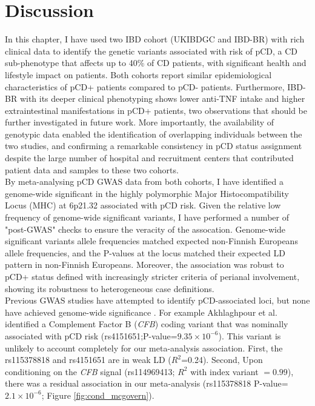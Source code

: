   
\section{Discussion}
In this chapter, I have used two IBD cohort (UKIBDGC and IBD-BR) with rich clinical data to identify the genetic variants associated with risk of pCD, a CD sub-phenotype that affects up to 40\% of CD patients, with significant health and lifestyle impact on patients. Both cohorts report similar epidemiological characteristics of pCD+ patients compared to pCD- patients. Furthermore, IBD-BR with its deeper clinical phenotyping shows lower anti-TNF intake and higher extraintestinal manifestations in pCD+ patients, two observations that should be further investigated in future work. More importantly, the availability of genotypic data enabled the identification of overlapping individuals between the two studies, and confirming a remarkable consistency in pCD status assignment despite the large number of hospital and recruitment centers that contributed patient data and samples to these two cohorts.\\

By meta-analysing pCD GWAS data from both cohorts, I have identified a genome-wide significant in the highly polymorphic Major Histocompatibility Locus (MHC) at 6p21.32 associated with pCD risk. Given the relative low frequency of genome-wide significant variants, I have performed a number of "post-GWAS" checks to ensure the veracity of the assocation. Genome-wide significant variants allele frequencies matched expected non-Finnish Europeans allele frequencies, and the P-values at the locus matched their expected LD pattern in non-Finnish Europeans. Moreover, the association was robust to pCD+ status defined with increasingly stricter criteria of perianal involvement, showing its robustness to heterogeneous case definitions. \\

Previous GWAS studies have attempted to identify pCD-associated loci, but none have achieved genome-wide significance \cite{Akhlaghpour2023-jw,Kaur2016-ut}. For example Akhlaghpour et al. identified a Complement Factor B (\textit{CFB}) coding variant that was nominally associated with pCD risk (rs4151651;P-value=$9.35\times10^{-6}$). This variant is unlikely to account completely for our meta-analysis association. First, the rs115378818 and rs4151651 are in weak LD ($R^{2}$=0.24). Second, Upon conditioning on the \textit{CFB} signal (rs114969413; $R^{2}$ with index variant $=0.99$), there was a residual association in our meta-analysis (rs115378818 P-value=$2.1\times10^{-6}$; Figure \ref{fig:cond_mcgovern}). \\

